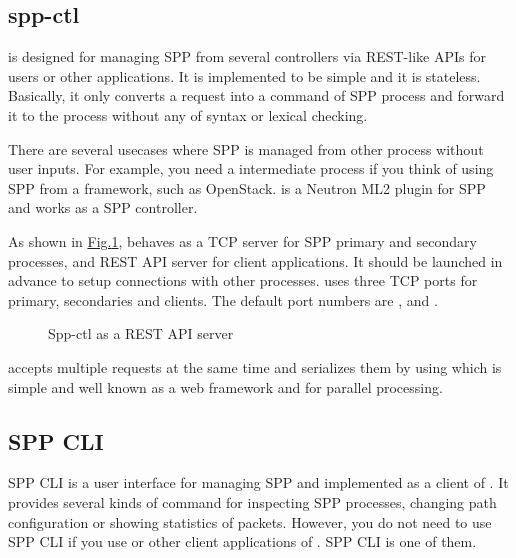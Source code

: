 \documentclass[a4paper,11pt,openany,oneside,english]{sphinxmanual}
\begin{document}
\subsection{spp-ctl}
\label{\detokenize{design/spp_controller:spp-ctl}}
 is designed for managing SPP from several controllers
via REST-like APIs for users or other applications.
It is implemented to be simple and it is stateless.
Basically, it only converts a request into a command of SPP process and
forward it to the process without any of syntax or lexical checking.

There are several usecases where SPP is managed from other process without
user inputs. For example, you need a intermediate process if you think of
using SPP from a framework, such as OpenStack.
is a Neutron ML2 plugin for SPP and  works as a SPP controller.

As shown in \hyperref[\detokenize{design/spp_controller:figure-spp-overview-design-spp-ctl}]{Fig.\@ \ref{\detokenize{design/spp_controller:figure-spp-overview-design-spp-ctl}}},
 behaves as a TCP server for SPP primary and secondary processes,
and REST API server for client applications.
It should be launched in advance to setup connections with other processes.
  uses three TCP ports for primary, secondaries and clients.
The default port numbers are ,  and .

\begin{figure}[htbp]
\centering
\capstart

\noindent{}
\caption{Spp-ctl as a REST API server}\label{\detokenize{design/spp_controller:id3}}\label{\detokenize{design/spp_controller:figure-spp-overview-design-spp-ctl}}\end{figure}

 accepts multiple requests at the same time and serializes them
by using
which is simple and well known as a web framework and
for parallel processing.


\subsection{SPP CLI}
\label{\detokenize{design/spp_controller:spp-cli}}
SPP CLI is a user interface for managing SPP and implemented as a client of
. It provides several kinds of command for inspecting SPP
processes, changing path configuration or showing statistics of packets.
However, you do not need to use SPP CLI if you use  or
other client applications of . SPP CLI is one of them.
\end{document}
